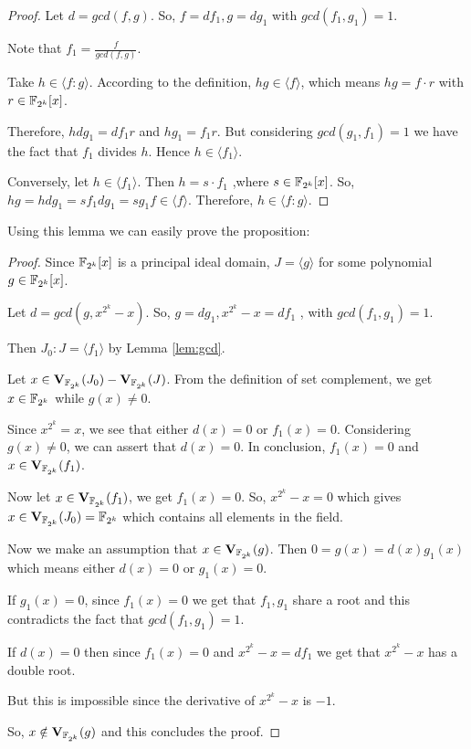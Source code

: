 \begin{proof}
Let $d = gcd(f, g)$. So, $f = df_1 , g = dg_1$ with $gcd(f_1 , g_1 ) = 1$.

Note that $f_1 = \frac{f}{gcd(f,g)}$.

Take $h \in \langle f : g\rangle$. According to the definition, $hg \in \langle f \rangle$, which means $hg = f \cdot r$ with $r \in {\mathbb{F}}_{2^k}[x]$.

Therefore, $hdg_1 = df_1 r$ and $hg_1 = f_1 r$. But considering $gcd(g_1 , f_1 ) = 1$ we have the fact that $f_1$
divides $h$. Hence $h \in \langle f_1\rangle$.

Conversely, let $h \in \langle f_1 \rangle$. Then $h = s \cdot f_1$ ,where $s \in {\mathbb{F}}_{2^k}[x]$. So, $hg = hdg_1 = sf_1 dg_1 = sg_1 f \in
\langle f \rangle$. Therefore, $h \in \langle f : g\rangle$.
\end{proof}
Using this lemma we can easily prove the proposition:

\begin{proof}
Since ${\mathbb{F}}_{2^k}[x]$ is a principal ideal domain, $ J = \langle g\rangle$ for some polynomial $ g \in {\mathbb{F}}_{2^k}[x]$.

Let $d = gcd(g, x^{2^k} - x)$. So, $g = dg_1 , x^{2^k} - x = df_1$ , with $gcd(f_1 , g_1 ) = 1$.

Then $J_0 : J = \langle f_1 \rangle$ by Lemma \ref{lem:gcd}.

Let $x \in{\bf V}_{{\mathbb{F}}_{2^k}} (J_0 ) - {\bf V}_{{\mathbb{F}}_{2^k}} (J)$. From the definition of set complement, we get $x \in {\mathbb{F}}_{2^k}$ while $g(x) \neq 0$.

Since $x^{2^k} = x$, we see that either $d(x) = 0$ or $f_1 (x) = 0$. Considering $g(x) \neq 0$, we can
assert that $d(x) = 0$. In conclusion, $f_1 (x) = 0$ and $x \in {\bf V}_{{\mathbb{F}}_{2^k}} (f_1 )$.

Now let $x \in {\bf V}_{{\mathbb{F}}_{2^k}} (f_1 )$, we get $f_1 (x) = 0$. So, $x^{2^k} - x = 0$ which gives $x \in {\bf V}_{{\mathbb{F}}_{2^k}} (J_0 ) = {\mathbb{F}}_{2^k}$ which 
contains all elements in the field.

Now we make an assumption that $x \in {\bf V}_{{\mathbb{F}}_{2^k}} (g)$. Then $0 = g(x) = d(x)g_1 (x)$ which means either $d(x) = 0$ or $g_1 (x) = 0$.

If $g_1 (x) = 0$, since $f_1 (x) = 0$ we get that $f_1 , g_1$ share a root and this contradicts the fact
that $gcd(f_1 , g_1 ) = 1$.

If $d(x) = 0$ then since $f_1 (x) = 0$ and $x^{2^k} - x = df_1$ we get that $x^{2^k} - x$ has a double root.

But this is impossible since the derivative of $x^{2^k} - x$ is $-1$.

So, $x \notin {\bf V}_{{\mathbb{F}}_{2^k}} (g)$ and this concludes the proof.
\end{proof}


